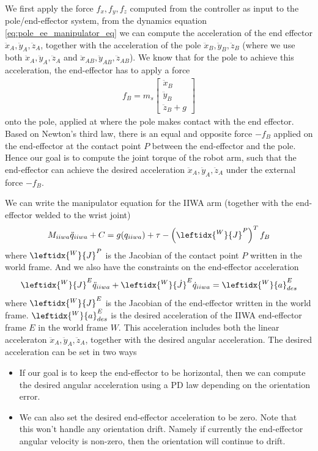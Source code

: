 \documentclass{article}
\begin{document}
We first apply the force $f_x, f_y, f_z$ computed from the controller as input to the pole/end-effector system, from the dynamics equation \eqref{eq:pole_ee_manipulator_eq} we can compute the acceleration of the end effector $\ddot{x}_A, \ddot{y}_A, \ddot{z}_A$, together with the acceleration of the pole $\ddot{x}_B, \ddot{y}_B, \ddot{z}_B$ (where we use both $\ddot{x}_A, \ddot{y}_A, \ddot{z}_A$ and $\ddot{x}_{AB}, \ddot{y}_{AB}, \ddot{z}_{AB}$). We know that for the pole to achieve this acceleration, the end-effector has to apply a force
\begin{align}
	f_B = m_s\begin{bmatrix}\ddot{x}_B \\ \ddot{y}_B \\ \ddot{z}_B + g\end{bmatrix}
\end{align}
onto the pole, applied at where the pole makes contact with the end effector. Based on Newton's third law, there is an equal and opposite force $-f_B$ applied on the end-effector at the contact point $P$ between the end-effector and the pole. Hence our goal is to compute the joint torque of the robot arm, such that the end-effector can achieve the desired acceleration $\ddot{x}_A, \ddot{y}_A, \ddot{z}_A$ under the external force $-f_B$.

We can write the manipulator equation for the IIWA arm (together with the end-effector welded to the wrist joint)
\begin{align}
	M_{iiwa}\ddot{q}_{iiwa} + C = g(q_{iiwa}) + \tau - \left(\leftidx{^W}{J}^P\right)^Tf_B\label{eq:iiwa_eom}
\end{align}
where $\leftidx{^W}{J}^P$ is the Jacobian of the contact point $P$ written in the world frame.
And we also have the constraints on the end-effector acceleration
\begin{align}
	\leftidx{^W}{J}^E\ddot{q}_{iiwa} + \leftidx{^W}{\dot{J}}^E\dot{q}_{iiwa} = \leftidx{^W}{a}^E_{des}\label{eq:iiwa_ee_acceleration}
\end{align}
where $\leftidx{^W}{J}^E$ is the Jacobian of the end-effector written in the world frame. $\leftidx{^W}{a}^E_{des}$ is the desired acceleration of the IIWA end-effector frame $E$ in the world frame $W$. This acceleration includes both the linear acceleraton $\ddot{x}_A, \ddot{y}_A, \ddot{z}_A$, together with the desired angular acceleration. The desired acceleration can be set in two ways
\begin{itemize}
	\item If our goal is to keep the end-effector to be horizontal, then we can compute the desired angular acceleration using a PD law depending on the orientation error.
	\item We can also set the desired end-effector acceleration to be zero. Note that this won't handle any orientation drift. Namely if currently the end-effector angular velocity is non-zero, then the orientation will continue to drift.
\end{itemize}
\end{document}
